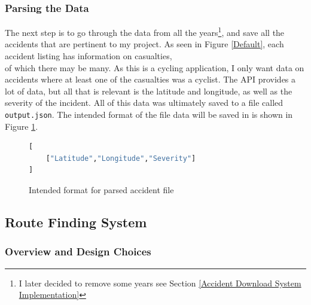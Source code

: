 \documentclass[11pt,twoside,a4paper]{article}
\begin{document}
\subsubsection{Parsing the Data}
The next step is to go through the data from all the years\footnote{I later decided to remove some years see Section \ref{Accident Download System Implementation}}, and save all the accidents that are pertinent to my project. As seen in Figure \ref{Default}, each accident listing has information on casualties,\\
of which there may be many. As this is a cycling application, I only want data on accidents where at least one of the casualties was a cyclist. The API provides a lot of data, but all that is relevant is
the latitude and longitude, as well as the severity of the incident. All of this data was ultimately saved to a file called \texttt{output.json}.
 The intended format of the file data will be saved in is shown in Figure \ref{accident format}.
\begin{figure}[t]
\begin{lstlisting}[language=Python]
[
    ["Latitude","Longitude","Severity"]
]
\end{lstlisting}
\caption{Intended format for parsed accident file}
\label{accident format}
\end{figure}
\newpage
\subsection{Route Finding System}
\subsubsection{Overview and Design Choices}
\end{document}
